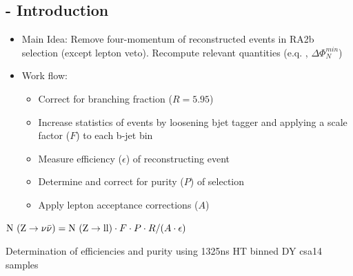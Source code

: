 \documentclass{beamer}
\begin{document}
\subsection{\Zll - Introduction}
\begin{frame}
\begin{itemize}
 \item Main Idea: Remove four-momentum of reconstructed \Zll events in RA2b selection (except lepton veto). Recompute relevant quantities (e.q. \met, $\Delta\Phi_{N}^{min}$)
 \item Work flow:
 \begin{itemize}
  \item Correct for branching fraction ($R = 5.95$)
  \item Increase statistics of \Zll events by loosening bjet tagger and applying a scale factor ($F$) to each b-jet bin
  \item Measure efficiency ($\epsilon$) of reconstructing \Zll event
  \item Determine and correct for purity ($P$) of \Zll selection
  \item Apply lepton acceptance corrections ($A$)
 \end{itemize}
\end{itemize}
  \begin{centering}
  $\text{N }(\text{Z}\rightarrow\nu\bar{\nu}) = \text{N }(\text{Z}\rightarrow\text{ll})\cdot F \cdot P \cdot R / (A\cdot \epsilon)$
  \end{centering}
  \begin{block}{}
\centering
Determination of \Zll efficiencies and purity using 13\tev 25ns HT binned DY csa14 samples
\end{block}
\end{frame}

\end{document}
